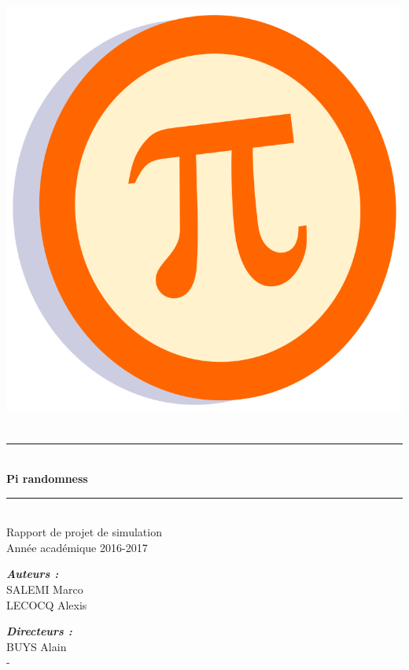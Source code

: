 \documentclass[10pt,a4paper]{article}
\newcommand{\HRule}{\rule{\linewidth}{0.5mm}}
\begin{document}
	\pagestyle{fancy}
	\fancyhf{}
	\cfoot{\thepage}
	
	\begin{titlepage}
		\begin{sffamily}
			\begin{center}
				\includegraphics[scale=1.5]{images/pi.png}~\\[1.5cm]
				
				\HRule \\[0.5cm]
				{ \huge \bfseries Pi randomness\\[0.4cm] }
				\HRule \\[1.5cm]
				
				\Large{Rapport de projet de simulation}\\[2cm]
				
				\Large{Année académique 2016-2017}\\[2cm]
				
				\begin{minipage}{0.4\textwidth}
					\begin{flushleft} \large
						\emph{\textbf{Auteurs :}}\\
						SALEMI Marco\\
						LECOCQ Alexis
					\end{flushleft}
				\end{minipage}
				\begin{minipage}{0.4\textwidth}
					\begin{flushright} \large
						\emph{\textbf{Directeurs :}}\\
						BUYS Alain\\
						-\\
					\end{flushright}
				\end{minipage}
				

\end{center}
\end{sffamily}
\end{titlepage}
\end{document}
